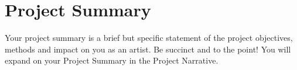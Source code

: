 \section{Project Summary}
Your project summary is a brief but specific statement of the project objectives, methods and impact on you as an artist. Be succinct and to the point! You will expand on your Project Summary in the Project Narrative.
